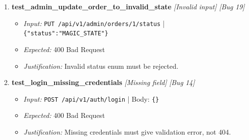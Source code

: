\documentclass{article}
\begin{document}
\begin{enumerate}[resume, label=\textbf{TC\arabic*.}]
\item \textbf{test\_admin\_update\_order\_to\_invalid\_state} \textit{[Invalid input] \textit{[Bug 19]}}
\begin{itemize}[noitemsep]
  \item \textit{Input:} \texttt{PUT /api/v1/admin/orders/1/status} | \texttt{\{"status":"MAGIC\_STATE"\}}
  \item \textit{Expected:} 400 Bad Request
  \item \textit{Justification:} Invalid status enum must be rejected.
\end{itemize}

\item \textbf{test\_login\_missing\_credentials} \textit{[Missing field] \textit{[Bug 14]}}
\begin{itemize}[noitemsep]
  \item \textit{Input:} \texttt{POST /api/v1/auth/login} | Body: \texttt{\{\}}
  \item \textit{Expected:} 400 Bad Request
  \item \textit{Justification:} Missing credentials must give validation error, not 404.
\end{itemize}
\end{enumerate}
\end{document}
